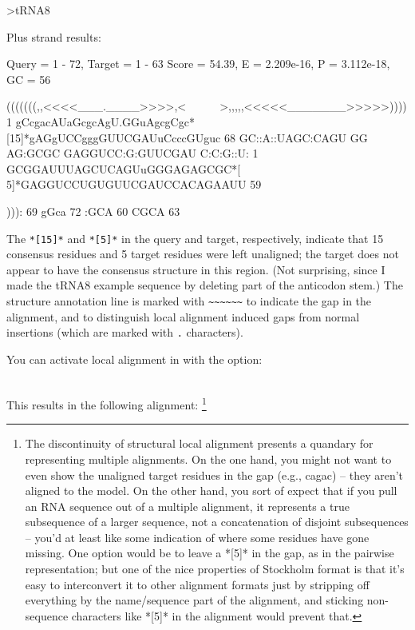 {\samepage
\begin{sreoutput}
>tRNA8

  Plus strand results:

 Query = 1 - 72, Target = 1 - 63
 Score = 54.39, E = 2.209e-16, P = 3.112e-18, GC =  56

           (((((((,,<<<<___.____>>>>,<~~~~~~>,,,,,<<<<<_______>>>>>))))
         1 gCcgacAUaGcgcAgU.GGuAgcgCgc*[15]*gAGgUCCgggGUUCGAUuCcccGUguc 68      
           GC::A::UAGC:CAGU GG AG:GCGC      GAGGUCC:G:GUUCGAU C:C:G::U:
         1 GCGGAUUUAGCUCAGUuGGGAGAGCGC*[ 5]*GAGGUCCUGUGUUCGAUCCACAGAAUU 59      

           ))):
        69 gGca 72      
           :GCA
        60 CGCA 63      
\end{sreoutput}
}

The \verb+*[15]*+ and \verb+*[5]*+ in the query and target,
respectively, indicate that 15 consensus residues and 5 target
residues were left unaligned; the target does not appear to have the
consensus structure in this region. (Not surprising, since I made the
tRNA8 example sequence by deleting part of the anticodon stem.)  The
structure annotation line is marked with \verb+~~~~~~+ to indicate the
gap in the alignment, and to distinguish local alignment induced gaps
from normal insertions (which are marked with \verb+.+ characters).

You can activate local alignment in  with the 
option:

\\

This results in the following alignment:
\footnote{The discontinuity of structural local alignment presents a
quandary for representing multiple alignments. On the one hand, you
might not want to even show the unaligned target residues in the gap
(e.g., cagac) -- they aren't aligned to the model. On the other hand,
you sort of expect that if you pull an RNA sequence out of a multiple
alignment, it represents a true subsequence of a larger sequence, not
a concatenation of disjoint subsequences -- you'd at least like some
indication of where some residues have gone missing. One option would
be to leave a *[5]* in the gap, as in the pairwise
representation; but one of the nice properties of Stockholm format is
that it's easy to interconvert it to other alignment formats just by
stripping off everything by the name/sequence part of the alignment,
and sticking non-sequence characters like *[5]* in the
alignment would prevent that.}

